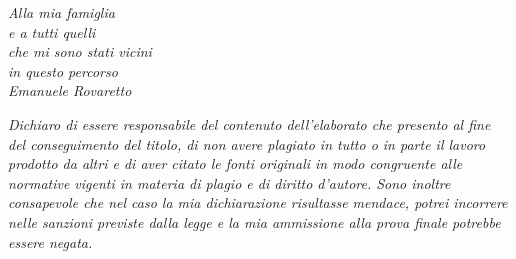 \thispagestyle{empty}
\begin{flushright}

    \vspace*{60mm}

    \emph{
    Alla mia famiglia\\
    e a tutti quelli \\
    che mi sono stati vicini \\
    in questo percorso \\
    \vspace{4mm}
    Emanuele Rovaretto\\
    }
    



\end{flushright}

\vspace*{90mm}
\noindent
\emph{Dichiaro di essere responsabile del contenuto dell'elaborato che presento al fine del
    conseguimento del titolo, di non avere plagiato in tutto o in parte il lavoro prodotto da
    altri e di aver citato le fonti originali in modo congruente alle normative vigenti in
    materia di plagio e di diritto d'autore. Sono inoltre consapevole che nel caso la mia
    dichiarazione risultasse mendace, potrei incorrere nelle sanzioni previste dalla legge e
    la mia ammissione alla prova finale potrebbe essere negata.}